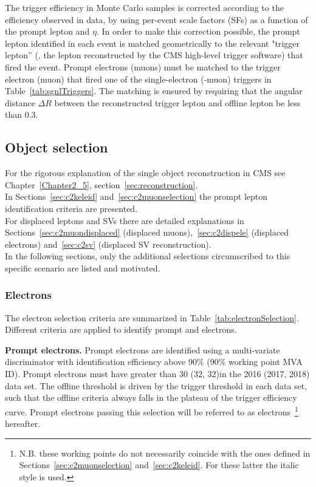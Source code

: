 The trigger efficiency in  Monte Carlo samples is corrected
according to the efficiency observed in data, by using per-event scale
factors (SFs) as a function of the prompt lepton \pt and $\eta$.
In order to make this correction possible, the prompt lepton
identified in each event is matched geometrically to the relevant
"trigger lepton'' (\ie, the lepton reconstructed by the CMS
high-level trigger software) that fired the event. Prompt electrons
(muons) must be matched to the trigger electron (muon) that fired one
of the single-electron (-muon) triggers in
Table~\ref{tab:sgnlTriggers}.
The matching is ensured by requiring that the angular distance
$\Delta R$ 
between the reconstructed trigger lepton and offline lepton be less
than 0.3. 

\subsection{Object selection}\label{sec:llobject}
For the rigorous explanation of the single object reconstruction in
CMS see Chapter~\ref{Chapter2_5}, section~\ref{sec:reconstruction}.\\
In Sections~\ref{sec:c2keleid} and~\ref{sec:c2muonselection} the
prompt lepton identification criteria are presented.\\
For displaced
leptons and SVs there are detailed explanations in
Sections~\ref{sec:c2muondisplaced} (displaced
muons),~\ref{sec:c2dispele} (displaced electrons) and~\ref{sec:c2sv}
(displaced SV reconstruction).\\

In the following sections, only the
additional selections circumscribed
to this specific scenario are listed and motivated.

\subsubsection{Electrons}\label{sec:llelectron}
The electron selection criteria are summarized in
Table~\ref{tab:electronSelection}. 
Different criteria are applied to identify prompt and \displ
electrons.

\textbf {Prompt electrons.}
Prompt electrons are identified using a multi-variate discriminator with identification efficiency above 90\%
(90\% working point MVA ID). Prompt electrons
must have \pt greater than 30 (32, 32)\GeV in the 2016 (2017, 2018)
data set.
The offline \pt threshold is driven by the trigger \pt threshold in
each data set, such that the offline criteria always falls in the plateau
of the trigger efficiency curve.
Prompt electrons passing this selection will be referred to as \tP electrons~\footnote{
N.B. these working points do not necessarily coincide with the ones
defined in Sections~\ref{sec:c2muonselection}
and~\ref{sec:c2keleid}. For these latter the italic style is used.} hereafter.

